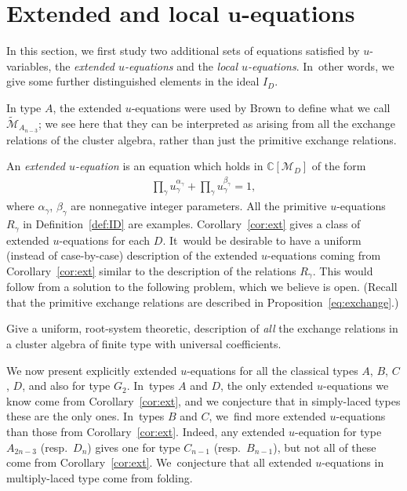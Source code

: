 \documentclass[pdftex]{sigma}%
\def\C{{\mathbb C}}
\def\M{{\mathcal{M}}}
\def\tM{{\widetilde {\mathcal{M}}}}
\numberwithin{equation}{section}
\begin{document}
\section[Extended and local u-equations]{Extended and local $\boldsymbol u$-equations}

In this section, we first study two additional sets of equations satisfied by $u$-variables, the {\it exten\-ded $u$-equations} and the {\it local $u$-equations}. In~other words, we give some further distinguished elements in the ideal $I_D$.

In type $A$, the extended $u$-equations were used by Brown \cite{Brown} to define what we call $\tM_{A_{n-3}}$; we see here that they can be interpreted as arising from all the exchange relations of the cluster algebra, rather than just the primitive exchange relations.

\bigskip{} %
An \emph{extended $u$-equation} is an equation which holds in $\C[\M_D]$ of the form
\begin{gather}\label{eq:extu}
\prod_\gamma u_\gamma^{\alpha_\gamma} + \prod_\gamma u_\gamma^{\beta_\gamma} =1,
\end{gather}
where $\alpha_\gamma$, $\beta_\gamma$ are nonnegative integer parameters. All the primitive $u$-equations $R_\gamma$ in Definition~\ref{def:ID} are examples. Corollary~\ref{cor:ext} gives a class of extended $u$-equations for each $D$. It~would be desirable to have a uniform (instead of case-by-case) description of the extended $u$-equations coming from Corollary~\ref{cor:ext} similar to the description of the relations $R_\gamma$. This would follow from a solution to the following problem, which we believe is open. (Recall that the primitive exchange relations are described in Proposition~\ref{eq:exchange}.)

\begin{problem}
Give a uniform, root-system theoretic, description of {\it all} the exchange relations in a cluster algebra of finite type with universal coefficients.
\end{problem}

We now present explicitly extended $u$-equations for all the classical types $A$, $B$, $C$, $D$, and also for type $G_2$. In~types $A$ and $D$, the only extended $u$-equations we know come from Corollary~\ref{cor:ext}, and we conjecture that in simply-laced types these are the only ones. In~types $B$ and $C$, we~find more extended $u$-equations than those from Corollary~\ref{cor:ext}. Indeed, any extended $u$-equation for type $A_{2n-3}$ (resp.\ $D_n$) gives one for type $C_{n-1}$ (resp.\ $B_{n-1}$), but not all of these come from Corollary~\ref{cor:ext}. We~conjecture that all extended $u$-equations in multiply-laced type come from folding.
\end{document}
